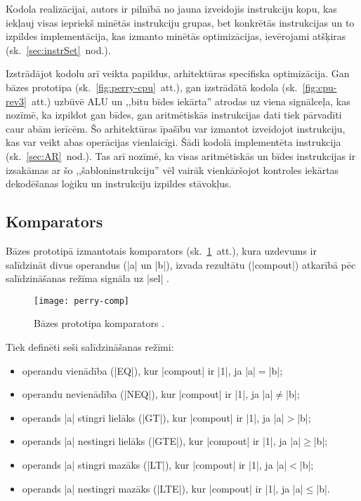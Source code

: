 	Kodola realizācijai, autors ir pilnībā no jauna izveidojis instrukciju
	kopu, kas iekļauj visas iepriekš minētās instrukciju grupas, bet
	konkrētās instrukcijas un to izpildes implementācija, kas izmanto minētās optimizācijas,
	ievērojami atšķiras (sk.~\ref{sec:instrSet}~nod.).
	
	Izstrādājot kodolu arī veikta papildus, arhitektūras specifiska
	optimizācija. Gan bāzes prototipa (sk.~\ref{fig:perry-cpu}~att.),
	gan izstrādātā kodola (sk.~\ref{fig:cpu-rev3}~att.) uzbūvē ALU un
	,,bitu bīdes iekārta'' atrodas uz viena signālceļa, kas nozīmē, ka
	izpildot gan bīdes, gan aritmētiskās instrukcijas dati tiek pārvadīti
	caur abām ierīcēm. Šo arhitektūras īpašību var izmantot izveidojot
	instrukciju, kas var veikt abas operācijas vienlaicīgi.
	Šādi kodolā implementēta  instrukcija (sk.~\ref{sec:AR}~nod.).
	Tas arī nozīmē, ka visas aritmētiskās un bīdes instrukcijas ir izsakāmas
	ar šo ,,šabloninstrukciju'' vēl vairāk vienkāršojot kontroles iekārtas
	dekodēšanas loģiku un instrukciju izpildes stāvokļus.
	
\subsection{Komparators} \label{sec:perry-comp}
	Bāzes prototipā izmantotais komparators (sk.~\ref{fig:perry-comp}~att.),
	kura uzdevums ir salīdzināt	divus operandus (|a| un |b|), izvada
	rezultātu (|compout|) atkarībā pēc salīdzināšanas režīma signāla uz |sel|
	\cite[309.~lpp.]{Perry-VHDL}.
	\begin{figure}[thb]
		\centering
		\texttt{[image: perry-comp]}
		\caption[Bāzes prototipa komparators.]
		        {Bāzes prototipa komparators \cite[309.~lpp.]{Perry-VHDL}.}
		\label{fig:perry-comp}
	\end{figure}
	
	Tiek definēti seši salīdzināšanas režīmi:
	\begin{itemize}
		\item operandu vienādība (|EQ|), kur |compout| ir |1|, ja |a|$=$|b|;
		\item operandu nevienādība (|NEQ|), kur |compout| ir |1|, ja |a|$\neq$|b|;
		\item operands |a| stingri lielāks (|GT|), kur |compout| ir |1|, ja |a|$>$|b|;
		\item operands |a| nestingri lielāks (|GTE|), kur |compout| ir |1|, ja |a|$\geq$|b|;
		\item operands |a| stingri mazāks (|LT|), kur |compout| ir |1|, ja |a|$<$|b|;
		\item operands |a| nestingri mazāks (|LTE|), kur |compout| ir |1|, ja |a|$\leq$|b|.
	\end{itemize}
	
